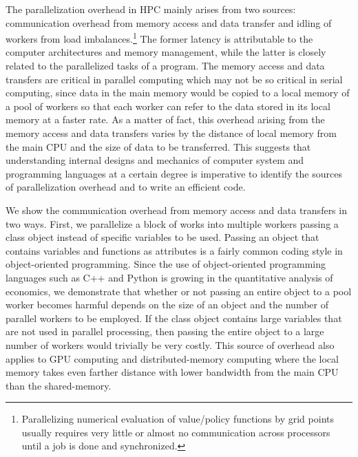 \documentclass[12pt]{article}
\begin{document}
The parallelization overhead in HPC mainly arises from two sources: communication overhead from memory access and data transfer and idling of workers from load imbalances.\footnote{\sf Parallelizing numerical evaluation of value/policy functions by grid points usually requires very little or almost no communication across processors until a job is done and synchronized.} The former latency is attributable to the computer architectures and memory management, while the latter is closely related to the parallelized tasks of a program. The memory access and data transfers are critical in parallel computing which may not be so critical in serial computing, since data in the main memory would be copied to a local memory of a pool of workers so that each worker can refer to the data stored in its local memory at a faster rate. As a matter of fact, this overhead arising from the memory access and data transfers varies by the distance of local memory from the main CPU and the size of data to be transferred. This suggests that understanding internal designs and mechanics of computer system and programming languages at a certain degree is imperative to identify the sources of parallelization overhead and to write an efficient code.

We show the communication overhead from memory access and data transfers in two ways. First, we parallelize a block of works into multiple workers passing a class object instead of specific variables to be used. Passing an object that contains variables and functions as attributes is a fairly common coding style in object-oriented programming. Since the use of object-oriented programming languages such as C++ and Python is growing in the quantitative analysis of economics, we demonstrate that whether or not passing an entire object to a pool worker becomes harmful depends on the size of an object and the number of parallel workers to be employed. If the class object contains large variables that are not used in parallel processing, then passing the entire object to a large number of workers would trivially be very costly. This source of overhead also applies to GPU computing and distributed-memory computing where the local memory takes even farther distance with lower bandwidth from the main CPU than the shared-memory.
\end{document}
